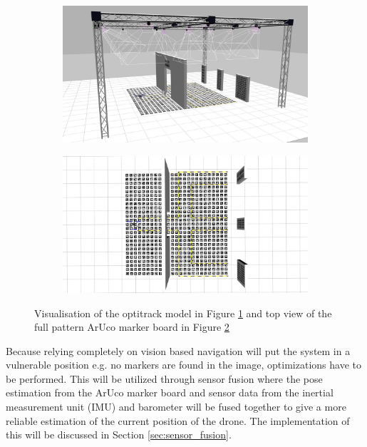 \documentclass[../Head/report.tex]{subfiles}
\begin{document}
\begin{figure}[H]
    \centering
    \begin{subfigure}[t]{.48\textwidth}
        \centering
        \includegraphics[width=\textwidth]{../Figures//3d-modeling/gazebo_full_pattern_view.jpg}
        \caption{}
        \label{fig:optitrack_full_pattern_aruco}
    \end{subfigure}
    \hfill
    \begin{subfigure}[t]{.48\textwidth}
        \centering
        \includegraphics[width=\textwidth]{../Figures/3d-modeling/gazebo_full_pattern.jpg}
        \caption{}
        \label{fig:full_pattern_aruco}
    \end{subfigure}
    \caption{Visualisation of the optitrack model in Figure \ref{fig:optitrack_full_pattern_aruco} and top view of the full pattern ArUco marker board in Figure \ref{fig:full_pattern_aruco}}
    \label{fig:full_pattern_aruco_fig}
\end{figure}

Because relying completely on vision based navigation will put the system in a vulnerable position e.g. no markers are found in the image, optimizations have to be performed. This will be utilized through sensor fusion where the pose estimation from the ArUco marker board and sensor data from the inertial measurement unit (IMU) and barometer will be fused together to give a more reliable estimation of the current position of the drone. The implementation of this will be discussed in Section \ref{sec:sensor_fusion}. 
\end{document}
